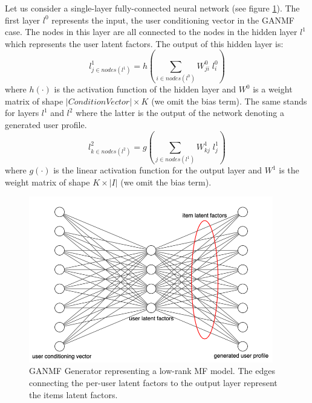 Let us consider a single-layer fully-connected neural network (see figure \ref{fig:generator_MF}). The first layer $l^0$ represents the input, the user conditioning vector in the GANMF case. The nodes in this layer are all connected to the nodes in the hidden layer $l^1$ which represents the user latent factors. The output of this hidden layer is:
\[
l^1_{j \in nodes(l^1)} = h(\sum_{i \in nodes(l^0)} W^0_{ji} \; l^0_{i})
\]
where $h(\cdot)$ is the activation function of the hidden layer and $W^0$ is a weight matrix of shape $|ConditionVector| \times K$ (we omit the bias term). The same stands for layers $l^1$ and $l^2$ where the latter is the output of the network denoting a generated user profile.
\begin{equation}
l^2_{k \in nodes(l^2)} = g(\sum_{j \in nodes(l^1)} W^1_{kj} \; l^1_{j})
\label{eq:output_layer_mult}
\end{equation}
where $g(\cdot)$ is the linear activation function for the output layer and $W^1$ is the weight matrix of shape $K \times |I|$ (we omit the bias term).
\begin{figure}[h!]
    \centering
    \includegraphics[width=0.95\textwidth]{model/fully_connected_generator.png}
    \caption{GANMF Generator representing a low-rank MF model. The edges connecting the per-user latent factors to the output layer represent the items latent factors.}
    \label{fig:generator_MF}
\end{figure}

